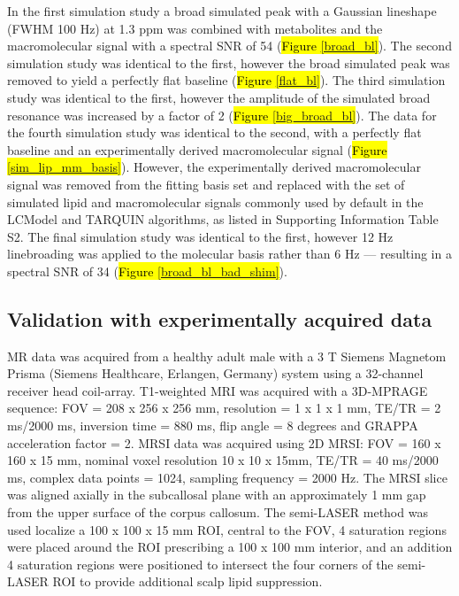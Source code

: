 \documentclass[num-refs]{wiley-article}
\newcommand{\revone}[2]{\hl{#1}\marginnote{\hl{#2}}}
\begin{document}
In the first simulation study a broad simulated peak with a Gaussian lineshape (FWHM 100 Hz) at 1.3 ppm was combined with metabolites and the macromolecular signal with a spectral SNR of 54 (\revone{Figure \ref{broad_bl}}{R1.22}). The second simulation study was identical to the first, however the broad simulated peak was removed to yield a perfectly flat baseline (\revone{Figure \ref{flat_bl}}{R1.22}). The third simulation study was identical to the first, however the amplitude of the simulated broad resonance was increased by a factor of 2 (\revone{Figure \ref{big_broad_bl}}{R1.22}). The data for the fourth simulation study was identical to the second, with a perfectly flat baseline and an experimentally derived macromolecular signal (\revone{Figure \ref{sim_lip_mm_basis}}{R1.22}). However, the experimentally derived macromolecular signal was removed from the fitting basis set and replaced with the set of simulated lipid and macromolecular signals commonly used by default in the LCModel and TARQUIN algorithms, as listed in Supporting Information Table S2. The final simulation study was identical to the first, however 12 Hz linebroading was applied to the molecular basis rather than 6 Hz --- resulting in a spectral SNR of 34 (\revone{Figure \ref{broad_bl_bad_shim}}{R1.22}).

\subsection{Validation with experimentally acquired data}

MR data was acquired from a healthy adult male with a 3 T Siemens Magnetom Prisma (Siemens Healthcare, Erlangen, Germany) system using a 32-channel receiver head coil-array. T1-weighted MRI was acquired with a 3D-MPRAGE sequence: FOV = 208 x 256 x 256 mm, resolution = 1 x 1 x 1 mm, TE/TR = 2 ms/2000 ms, inversion time = 880 ms, flip angle = 8 degrees and GRAPPA acceleration factor = 2. MRSI data was acquired using 2D MRSI: FOV = 160 x 160 x 15 mm, nominal voxel resolution 10 x 10 x 15mm, TE/TR = 40 ms/2000 ms, complex data points = 1024, sampling frequency = 2000 Hz. The MRSI slice was aligned axially in the subcallosal plane with an approximately 1 mm gap from the upper surface of the corpus callosum. The semi-LASER method \cite{Scheenen2008} was used localize a 100 x 100 x 15 mm ROI, central to the FOV, 4 saturation regions were placed around the ROI prescribing a 100 x 100 mm interior, and an addition 4 saturation regions were positioned to intersect the four corners of the semi-LASER ROI to provide additional scalp lipid suppression.
\end{document}
